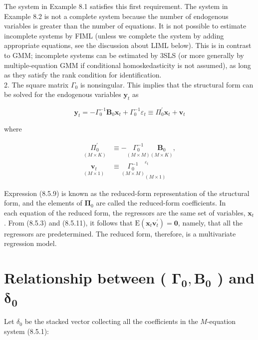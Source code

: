\documentclass[10pt]{article}
\begin{document}
The system in Example 8.1 satisfies this first requirement. The system in Example 8.2 is not a complete system because the number of endogenous variables is greater than the number of equations. It is not possible to estimate incomplete systems by FIML (unless we complete the system by adding appropriate equations, see the discussion about LIML below). This is in contrast to GMM; incomplete systems can be estimated by 3SLS (or more generally by multiple-equation GMM if conditional homoskedasticity is not assumed), as long as they satisfy the rank condition for identification.\\
2. The square matrix $\Gamma_{0}$ is nonsingular. This implies that the structural form can be solved for the endogenous variables $\mathbf{y}_{t}$ as


\begin{equation*}
\mathbf{y}_{t}=-\Gamma_{0}^{-1} \mathbf{B}_{0} \mathbf{x}_{t}+\Gamma_{0}^{-1} \varepsilon_{t} \equiv \Pi_{0}^{\prime} \mathbf{x}_{t}+\mathbf{v}_{t} \tag{8.5.9}
\end{equation*}


where


\begin{align*}
\underset{(M \times K)}{\Pi_{0}^{\prime}} & \equiv-\underset{(M \times M)}{\Gamma_{0}^{-1}} \underset{(M \times K)}{\mathbf{B}_{0}},  \tag{8.5.10}\\
\underset{(M \times 1)}{\mathbf{v}_{t}} & \equiv{\underset{(M \times M)}{\Gamma_{0}^{-1}}}_{(M \times 1)}^{\varepsilon_{t}} \tag{8.5.11}
\end{align*}


Expression (8.5.9) is known as the reduced-form representation of the structural form, and the elements of $\boldsymbol{\Pi}_{0}$ are called the reduced-form coefficients. In\\
each equation of the reduced form, the regressors are the same set of variables, $\mathbf{x}_{t}$. From (8.5.3) and (8.5.11), it follows that $\mathrm{E}\left(\mathbf{x}_{t} \mathbf{v}_{t}^{\prime}\right)=\mathbf{0}$, namely, that all the regressors are predetermined. The reduced form, therefore, is a multivariate regression model.

\section*{Relationship between ( $\boldsymbol{\Gamma}_{\mathbf{0}}, \mathbf{B}_{\mathbf{0}}$ ) and $\boldsymbol{\delta}_{\mathbf{0}}$}
Let $\delta_{0}$ be the stacked vector collecting all the coefficients in the $M$-equation system (8.5.1):
\end{document}
